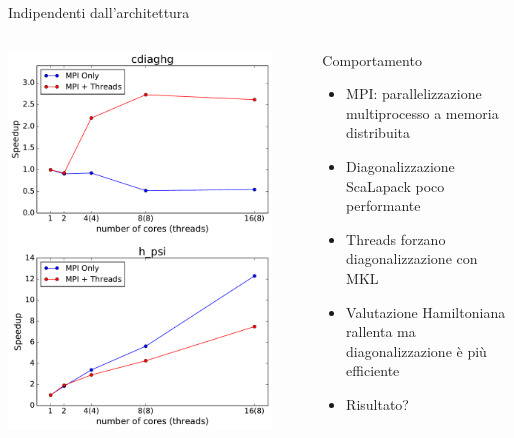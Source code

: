\documentclass[8pt]{beamer}
\begin{document}
\begin{frame}{Indipendenti dall'architettura}
\begin{columns}[c]
{\begin{center}
{	\includegraphics[width=0.9\textwidth, height=0.85 \textheight]{beam_threads_subroutines_MPI_threads.pdf}	
	}
\end{center}
}

\begin{center}
\begin{overlayarea}{\linewidth}{\textheight}


	\begin{block}{Comportamento}
		\begin{itemize}
			\item<1-> MPI: parallelizzazione multiprocesso a memoria distribuita
			\item<2-> Diagonalizzazione ScaLapack poco performante
			\item<3-> Threads forzano diagonalizzazione con MKL
			\item<4-> Valutazione Hamiltoniana rallenta ma diagonalizzazione \`e pi\`u efficiente
			\item<5-> Risultato?
		\end{itemize}
	\end{block}

\end{overlayarea}
\end{center}

\end{columns}


\end{frame}
\end{document}
